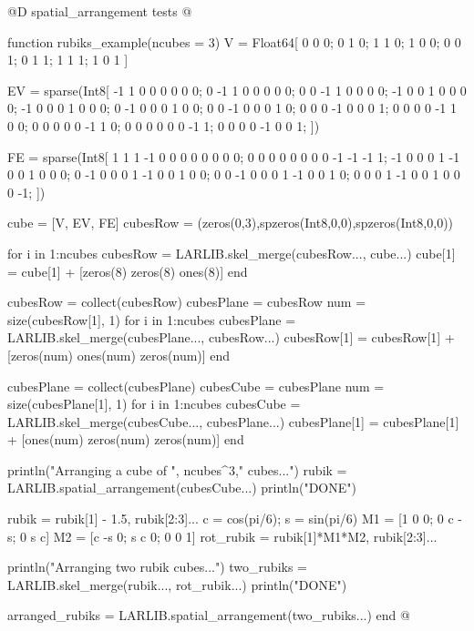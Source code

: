 @D spatial\_arrangement tests
@{function rubiks_example(ncubes = 3)
    V = Float64[
        0 0 0; 0 1 0;
        1 1 0; 1 0 0;
        0 0 1; 0 1 1;
        1 1 1; 1 0 1
    ]

    EV = sparse(Int8[
        -1  1  0  0  0  0  0  0;
        0 -1  1  0  0  0  0  0;
        0  0 -1  1  0  0  0  0;
        -1  0  0  1  0  0  0  0;
        -1  0  0  0  1  0  0  0;
        0 -1  0  0  0  1  0  0;
        0  0 -1  0  0  0  1  0;
        0  0  0 -1  0  0  0  1;
        0  0  0  0 -1  1  0  0;
        0  0  0  0  0 -1  1  0;
        0  0  0  0  0  0 -1  1;
        0  0  0  0 -1  0  0  1;
    ])

    FE = sparse(Int8[
        1  1  1 -1  0  0  0  0  0  0  0  0;
        0  0  0  0  0  0  0  0 -1 -1 -1  1;
        -1  0  0  0  1 -1  0  0  1  0  0  0;
        0 -1  0  0  0  1 -1  0  0  1  0  0;
        0  0 -1  0  0  0  1 -1  0  0  1  0;
        0  0  0  1 -1  0  0  1  0  0  0 -1;
    ])

    cube = [V, EV, FE]
    cubesRow = (zeros(0,3),spzeros(Int8,0,0),spzeros(Int8,0,0))

    for i in 1:ncubes
        cubesRow = LARLIB.skel_merge(cubesRow..., cube...)
        cube[1] = cube[1] + [zeros(8) zeros(8) ones(8)]
    end

    cubesRow = collect(cubesRow)
    cubesPlane = cubesRow
    num = size(cubesRow[1], 1)
    for i in 1:ncubes
        cubesPlane = LARLIB.skel_merge(cubesPlane..., cubesRow...)
        cubesRow[1] = cubesRow[1] + [zeros(num) ones(num) zeros(num)]
    end

    cubesPlane = collect(cubesPlane)
    cubesCube = cubesPlane
    num = size(cubesPlane[1], 1)
    for i in 1:ncubes
        cubesCube = LARLIB.skel_merge(cubesCube..., cubesPlane...)
        cubesPlane[1] = cubesPlane[1] + [ones(num) zeros(num) zeros(num)]
    end

    println("Arranging a cube of ", ncubes^3," cubes...")
    rubik = LARLIB.spatial_arrangement(cubesCube...)
    println("DONE")

    rubik = rubik[1] - 1.5, rubik[2:3]...
    c = cos(pi/6); s = sin(pi/6)
    M1 = [1  0 0; 0 c -s; 0 s c]
    M2 = [c -s 0; s c  0; 0 0 1]
    rot_rubik = rubik[1]*M1*M2, rubik[2:3]...

    println("Arranging two rubik cubes...")
    two_rubiks = LARLIB.skel_merge(rubik..., rot_rubik...)
    println("DONE")

    arranged_rubiks = LARLIB.spatial_arrangement(two_rubiks...)
end
@}

